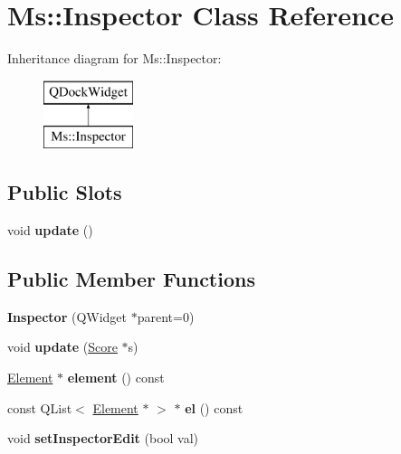 \hypertarget{class_ms_1_1_inspector}{}\section{Ms\+:\+:Inspector Class Reference}
\label{class_ms_1_1_inspector}
Inheritance diagram for Ms\+:\+:Inspector\+:\begin{figure}[H]
\begin{center}
\leavevmode
\includegraphics[height=2.000000cm]{class_ms_1_1_inspector}
\end{center}
\end{figure}
\subsection*{Public Slots}
\begin{DoxyCompactItemize}
\item 
\mbox{\label{class_ms_1_1_inspector_a389a434407801e76a7b32b795b2525ee}} 
void {\bfseries update} ()
\end{DoxyCompactItemize}
\subsection*{Public Member Functions}
\begin{DoxyCompactItemize}
\item 
\mbox{\label{class_ms_1_1_inspector_a3e95caed1ee5df56e42fb8793dcb4a5b}} 
{\bfseries Inspector} (Q\+Widget $\ast$parent=0)
\item 
\mbox{\label{class_ms_1_1_inspector_a0421d44c35f640f1e0dd1fabb0565859}} 
void {\bfseries update} (\hyperlink{class_ms_1_1_score}{Score} $\ast$s)
\item 
\mbox{\label{class_ms_1_1_inspector_aee0cec8b1839186fc9f4ea91cce97c68}} 
\hyperlink{class_ms_1_1_element}{Element} $\ast$ {\bfseries element} () const
\item 
\mbox{\label{class_ms_1_1_inspector_aef701ecf96a231c55b6004e73748c7d5}} 
const Q\+List$<$ \hyperlink{class_ms_1_1_element}{Element} $\ast$ $>$ $\ast$ {\bfseries el} () const
\item 
\mbox{\label{class_ms_1_1_inspector_a5c5c3d2a1534ab3aba0dd62070d6dc2d}} 
void {\bfseries set\+Inspector\+Edit} (bool val)
\end{DoxyCompactItemize}
